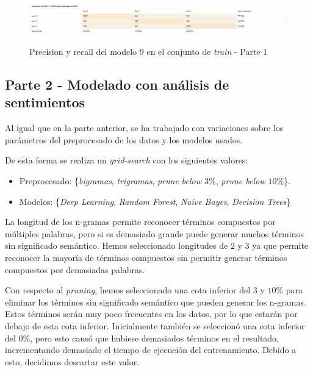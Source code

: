 \documentclass[es]{uc3mreport}
\begin{document}
\begin{report}
    \begin{figure}[H]
        \center
        \includegraphics[width=\linewidth]{train1.jpeg}\\ 
        \caption{Precision y recall del modelo 9 en el conjunto de \textit{train} - Parte 1}
    \end{figure}

\subsection{Parte 2 - Modelado con análisis de sentimientos}
\label{sec:parte2}

    Al igual que en la parte anterior, se ha trabajado con variaciones
    sobre los parámetros del preprocesado de los datos y los modelos usados.

    De esta forma se realiza un \textit{grid-search} con los siguientes valores:
    \begin{itemize}
        \item Preprocesado: \{\textit{bigramas}, \textit{trigramas}, \textit{prune below $3\%$}, \textit{prune below $10\%$}\}.
        \item Modelos: \{\textit{Deep Learning}, \textit{Random Forest}, \textit{Naive Bayes}, \textit{Decision Trees}\}
    \end{itemize}

    La longitud de los n-gramas permite reconocer términos compuestos por múltiples
    palabras, pero si es demasiado grande puede generar muchos términos sin significado
    semántico. Hemos seleccionado longitudes de $2$ y $3$ ya que permite reconocer
    la mayoría de términos compuestos sin permitir generar términos compuestos
    por demasiadas palabras.

    Con respecto al \textit{pruning}, hemos seleccionado una cota inferior del $3$ y $10$\%
    para eliminar los términos sin significado semántico que pueden generar los
    n-gramas. Estos términos serán muy poco frecuentes en los datos, por lo que
    estarán por debajo de esta cota inferior. Inicialmente también se seleccionó
    una cota inferior del $0\%$, pero esto causó que hubiese demasiados términos
    en el resultado, incrementando demasiado el tiempo de ejecución del entrenamiento.
    Debido a esto, decidimos descartar este valor.


\end{report}
\end{document}

